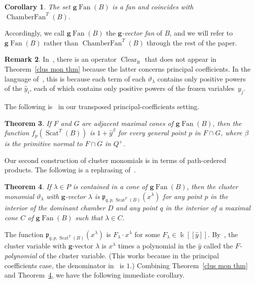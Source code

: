 \documentclass[10pt,a4paper]{amsart}
\newtheorem{theorem}{Theorem}[section]
\newtheorem{coro}[theorem]{Corollary}
\theoremstyle{definition}
\newtheorem{rema}[theorem]{Remark}
\DeclareMathOperator{\fr}{fr}
\DeclareMathOperator{\Scat}{Scat}
\DeclareMathOperator{\Fan}{Fan}
\DeclareMathOperator{\ChamberFan}{ChamberFan}
\DeclareMathOperator{\Clear}{Clear}
\newcommand{\gFan}{\g\!\Fan}
\newcommand{\newword}[1]{\emph{#1}}
\newcommand\llbracket{[\![}
\newcommand\rrbracket{]\!]}
\newcommand{\thet}{\vartheta}
\newcommand{\p}{{\mathfrak p}}
\newcommand{\g}{\mathbf{g}}
\renewcommand{\k}{\Bbbk}
\newcommand{\hy}{\hat{y}}
\begin{document}
\begin{coro}\label{cham g}
The set $\gFan(B)$ is a fan and coincides with $\ChamberFan^T(B)$.
\end{coro}

Accordingly, we call $\gFan(B)$ the \newword{$\g$-vector fan} of $B$, and we will refer to $\gFan(B)$ rather than $\ChamberFan^T(B)$ through the rest of the paper.

\begin{rema}\label{Clear fr}
In~\cite[Theorem~5.2]{scatfan}, there is an operator $\Clear_{\fr}$ that does not appear in Theorem~\ref{clus mon thm} because the latter concerns principal coefficients.
In the language of~\cite{scatfan}, this is because each term of each $\thet_\lambda$ contains only positive powers of the $\hy_i$, each of which contains only positive powers of the frozen variables~$y_j$.
\end{rema}

The following is~\cite[Theorem~4.6]{scatfan} in our transposed principal-coefficients setting.
\begin{theorem}\label{clus easy root}
If $F$ and $G$ are adjacent maximal cones of $\gFan(B)$, then the function $f_p(\Scat^T(B))$ is $1+\hy^{\beta}$ for every general point $p$ in $F\cap G$, where $\beta$ is the primitive normal to $F\cap G$ in $Q^+$.
\end{theorem}

Our second construction of cluster monomials is in terms of path-ordered products.
The following is a rephrasing of~\cite[Theorem~5.6]{scatfan}.

\begin{theorem}\label{clus mon pop root}
If $\lambda\in P$ is contained in a cone of $\gFan(B)$, then the cluster monomial $\thet_\lambda$ with $\g$-vector $\lambda$ is $\p_{q,p,\Scat^T(B)}(x^\lambda)$ for any point $p$ in the interior of the dominant chamber $D$ and any point $q$ in the interior of a maximal cone $C$ of $\gFan(B)$ such that $\lambda\in C$.
\end{theorem}

The function $\p_{q,p,\Scat^T(B)}(x^\lambda)$ is $F_\lambda\cdot x^\lambda$ for some $F_\lambda\in\k\llbracket \hy\rrbracket $.
By~\cite[Corollary~6.3]{ca4}, the cluster variable with $\g$-vector $\lambda$ is $x^\lambda$ times a polynomial in the $\hy$ called the \newword{$F$-polynomial} of the cluster variable.
(This works because in the principal coefficients case, the denominator in~\cite[(6.5)]{ca4} is $1$.)
Combining Theorem~\ref{clus mon thm} and Theorem~\ref{clus mon pop root}, we have the following immediate corollary.
\end{document}
